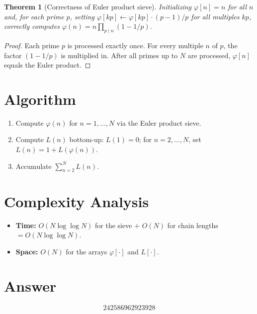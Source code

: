\documentclass[12pt]{article}
\newtheorem{theorem}{Theorem}
\begin{document}
\begin{theorem}[Correctness of Euler product sieve]
Initializing $\varphi[n] = n$ for all $n$ and, for each prime $p$, setting $\varphi[kp] \leftarrow \varphi[kp] \cdot (p-1)/p$ for all multiples $kp$, correctly computes $\varphi(n) = n\prod_{p \mid n}(1 - 1/p)$.
\end{theorem}

\begin{proof}
Each prime $p$ is processed exactly once. For every multiple $n$ of $p$, the factor $(1 - 1/p)$ is multiplied in. After all primes up to $N$ are processed, $\varphi[n]$ equals the Euler product.
\end{proof}

\section{Algorithm}
\begin{enumerate}
\item Compute $\varphi(n)$ for $n = 1, \ldots, N$ via the Euler product sieve.
\item Compute $L(n)$ bottom-up: $L(1) = 0$; for $n = 2, \ldots, N$, set $L(n) = 1 + L(\varphi(n))$.
\item Accumulate $\sum_{n=2}^{N} L(n)$.
\end{enumerate}

\section{Complexity Analysis}
\begin{itemize}
\item \textbf{Time:} $O(N \log\log N)$ for the sieve $+$ $O(N)$ for chain lengths $= O(N \log\log N)$.
\item \textbf{Space:} $O(N)$ for the arrays $\varphi[\cdot]$ and $L[\cdot]$.
\end{itemize}

\section{Answer}

\[
\boxed{242586962923928}
\]
\end{document}
